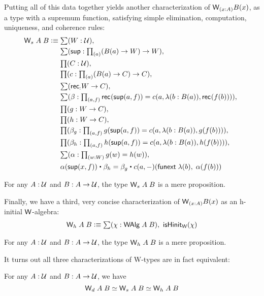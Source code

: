 Putting all of this data together yields another characterization of $\wtype{x:A} B(x)$, as a type with a supremum function, satisfying simple elimination, computation, uniqueness, and coherence rules:
\begin{align*}
\w_s \; A \; B \defeq & \; \sm{W : \type} \\
                      & \; \sm{\supp : \prd {a} (B(a) \to W) \to W} \\
                      & \; \prd{C : \type} \\
                      & \; \prd{c : \prd{a} (B(a) \to C) \to C} \\
                      & \; \sm{\rec : W \to C} \\
                      & \; \sm{\beta : \prd{a,f} \rec{}(\supp(a,f)) = c(a,\lambda (b: B(a)), \rec{}(f(b)))} \\
                      & \; \prd{g : W \to C} \\
                      & \; \prd{h : W \to C} \\
                      & \; \prd{\beta_g : \prd{a,f} g(\supp(a,f)) = c(a,\lambda (b: B(a)), g(f(b)))} \\
                      & \; \prd{\beta_h : \prd{a,f} h(\supp(a,f)) = c(a,\lambda (b: B(a)), h(f(b)))} \\
                      & \; \sm{\alpha : \prd {w : W} g(w) = h(w)} \\
                      & \; \alpha(\supp(x,f)) \ct \beta_h = \beta_g \ct c(a,-)(\funext \; \lambda (b), \; \alpha(f(b)))
\end{align*}

\begin{thm}
For any $A : \mathcal{U}$ and $B : A \to \mathcal{U}$, the type $\mathsf{W}_s \; A \; B$ is a mere proposition.
\end{thm}

Finally, we have a third, very concise characterization of $\wtype{x:A} B(x)$ as an h-initial $\mathsf{W}$-algebra:
\begin{align*}
\w_h \; A \; B \defeq \sm{\chi : \walg \; A \; B} \ishinitw(\chi)
\end{align*}

\begin{thm}
For any $A : \mathcal{U}$ and $B : A \to \mathcal{U}$, the type $\mathsf{W}_h \; A \; B$ is a mere proposition.
\end{thm}

It turns out all three characterizations of W-types are in fact equivalent:
\begin{thm}
For any $A : \mathcal{U}$ and $B : A \to \mathcal{U}$, we have
\[ \mathsf{W}_d \; A \; B \simeq \mathsf{W}_s \; A \; B \simeq \mathsf{W}_h \; A \; B \]
\end{thm}

